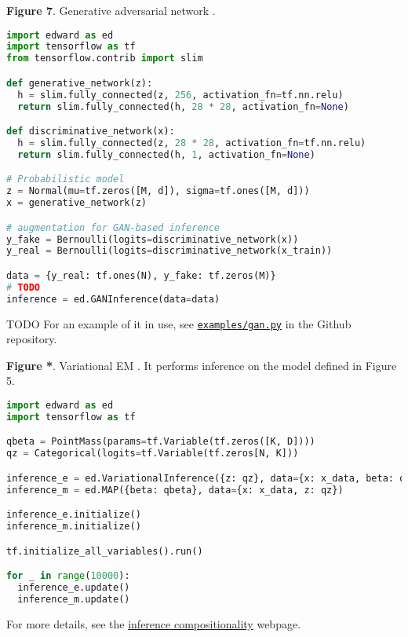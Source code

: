 \textbf{Figure 7}. Generative adversarial network
\citep{goodfellow2014generative}.
\begin{lstlisting}[language=python]
import edward as ed
import tensorflow as tf
from tensorflow.contrib import slim

def generative_network(z):
  h = slim.fully_connected(z, 256, activation_fn=tf.nn.relu)
  return slim.fully_connected(h, 28 * 28, activation_fn=None)

def discriminative_network(x):
  h = slim.fully_connected(z, 28 * 28, activation_fn=tf.nn.relu)
  return slim.fully_connected(h, 1, activation_fn=None)

# Probabilistic model
z = Normal(mu=tf.zeros([M, d]), sigma=tf.ones([M, d]))
x = generative_network(z)

# augmentation for GAN-based inference
y_fake = Bernoulli(logits=discriminative_network(x))
y_real = Bernoulli(logits=discriminative_network(x_train))

data = {y_real: tf.ones(N), y_fake: tf.zeros(M)}
# TODO
inference = ed.GANInference(data=data)
\end{lstlisting}
TODO
For an example of it in use, see
\href{https://github.com/blei-lab/edward/blob/master/examples/gan.py}{\texttt{examples/gan.py}}
in the Github repository.

\textbf{Figure *}. Variational EM \citep{neal1993new}.
It performs inference on the model defined in Figure 5.
\begin{lstlisting}[language=python]
import edward as ed
import tensorflow as tf

qbeta = PointMass(params=tf.Variable(tf.zeros([K, D])))
qz = Categorical(logits=tf.Variable(tf.zeros[N, K]))

inference_e = ed.VariationalInference({z: qz}, data={x: x_data, beta: qbeta})
inference_m = ed.MAP({beta: qbeta}, data={x: x_data, z: qz})

inference_e.initialize()
inference_m.initialize()

tf.initialize_all_variables().run()

for _ in range(10000):
  inference_e.update()
  inference_m.update()
\end{lstlisting}
For more details, see the
\href{/api/inference-compositionality}{inference compositionality} webpage.

